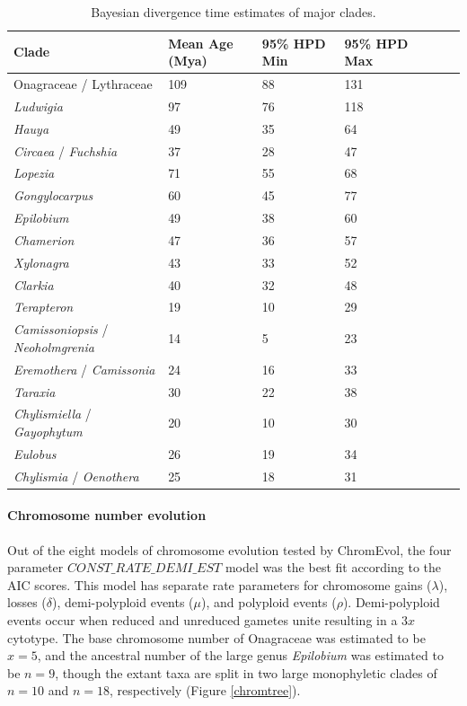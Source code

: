 \documentclass[review]{elsarticle}
\begin{document}
\begin{table}
   \center
   \begin{adjustbox}{max width=\textwidth}
      \begin{tabular}{lllllll}
         \toprule
         Clade & Mean Age (Mya) & 95\% HPD Min & 95\% HPD Max \\ 
	 \midrule
         Onagraceae / Lythraceae & 109 & 88 & 131 \\
         \textit{Ludwigia} & 97 & 76 & 118 \\
	 \textit{Hauya} & 49 & 35 & 64 \\
	 \textit{Circaea} / \textit{Fuchshia} & 37 & 28 & 47 \\
	 \textit{Lopezia} & 71 & 55 & 68 \\
	 \textit{Gongylocarpus} & 60 & 45 & 77 \\
	 \textit{Epilobium} & 49 & 38 & 60 \\
	 \textit{Chamerion} & 47 & 36 & 57 \\
	 \textit{Xylonagra} & 43 & 33 & 52 \\
	 \textit{Clarkia} & 40 & 32 & 48 \\
         \textit{Terapteron} & 19 & 10 & 29 \\
	 \textit{Camissoniopsis} / \textit{Neoholmgrenia} & 14 & 5 & 23 \\
	 \textit{Eremothera} / \textit{Camissonia} & 24 & 16 & 33 \\
	 \textit{Taraxia} & 30 & 22 & 38 \\
	 \textit{Chylismiella} / \textit{Gayophytum} & 20 & 10 & 30 \\
	 \textit{Eulobus} & 26 & 19 & 34 \\
	 \textit{Chylismia} / \textit{Oenothera} & 25 & 18 & 31 \\
         \bottomrule
      \end{tabular}
   \end{adjustbox}
   \caption{Bayesian divergence time estimates of major clades.}
   \label{times}
\end{table}

\paragraph{Chromosome number evolution}
Out of the eight models of chromosome evolution tested by ChromEvol,
the four parameter $CONST\_RATE\_DEMI\_EST$ model was the best fit according to the AIC scores. 
This model has separate rate parameters for
chromosome gains ($\lambda$),
losses ($\delta$),
demi-polyploid events ($\mu$),
and polyploid events ($\rho$).
Demi-polyploid events occur when reduced and unreduced gametes unite
resulting in a $3x$ cytotype.
The base chromosome number of Onagraceae was estimated to be $x=5$,
and the ancestral number of the large genus \textit{Epilobium} was estimated to be $n=9$,
though the extant taxa are split in two large monophyletic clades of 
$n=10$ and $n=18$, respectively (Figure \ref{chromtree}).
\end{document}

